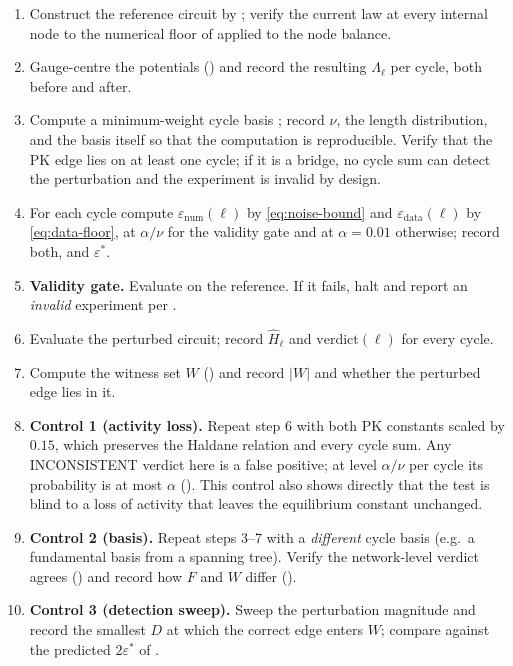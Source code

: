 \documentclass[11pt,a4paper]{article}
\theoremstyle{definition}
\theoremstyle{remark}
\newcommand{\abs}[1]{\lvert#1\rvert}
\newcommand{\eps}{\varepsilon}
\newcommand{\epsnum}{\eps_{\mathrm{num}}}
\newcommand{\epsdata}{\eps_{\mathrm{data}}}
\newcommand{\epsstar}{\eps^{\ast}}
\newcommand{\hol}{H}
\begin{document}
\begin{protocol}
\leavevmode
\begin{enumerate}[leftmargin=1.5em,itemsep=3pt]
\item Construct the reference circuit by
; verify the current law at every internal
node to the numerical floor of  applied to the
node balance.
\item Gauge-centre the potentials () and record the
resulting $\Lambda_\ell$ per cycle, both before and after.
\item Compute a minimum-weight cycle basis \citep{horton1987}; record
$\nu$, the length distribution, and the basis itself so that the
computation is reproducible. Verify that the PK edge lies on at least
one cycle; if it is a bridge, no cycle sum can detect the perturbation
and the experiment is invalid by design.
\item For each cycle compute $\epsnum(\ell)$ by \eqref{eq:noise-bound}
and $\epsdata(\ell)$ by \eqref{eq:data-floor}, at $\alpha/\nu$ for the
validity gate and at $\alpha=0.01$ otherwise; record both, and
$\epsstar$.
\item \textbf{Validity gate.} Evaluate  on the
reference. If it fails, halt and report an \emph{invalid} experiment per
.
\item Evaluate the perturbed circuit; record $\widehat{\hol}_\ell$ and
$\mathrm{verdict}(\ell)$ for every cycle.
\item Compute the witness set $W$ () and record
$\abs{W}$ and whether the perturbed edge lies in it.
\item \textbf{Control 1 (activity loss).} Repeat step 6 with both PK
constants scaled by $0.15$, which preserves the Haldane relation and
every cycle sum. Any \textsf{INCONSISTENT} verdict here is a false
positive; at level $\alpha/\nu$ per cycle its probability is at most
$\alpha$ (). This control also shows
directly that the test is blind to a loss of activity that leaves the
equilibrium constant unchanged.
\item \textbf{Control 2 (basis).} Repeat steps 3--7 with a
\emph{different} cycle basis (e.g.\ a fundamental basis from a spanning
tree). Verify the network-level verdict agrees
() and record how $F$ and $W$ differ
().
\item \textbf{Control 3 (detection sweep).} Sweep the perturbation
magnitude and record the smallest $D$ at which the correct edge enters
$W$; compare against the predicted $2\epsstar$ of
.
\end{enumerate}
\end{protocol}
\end{document}
